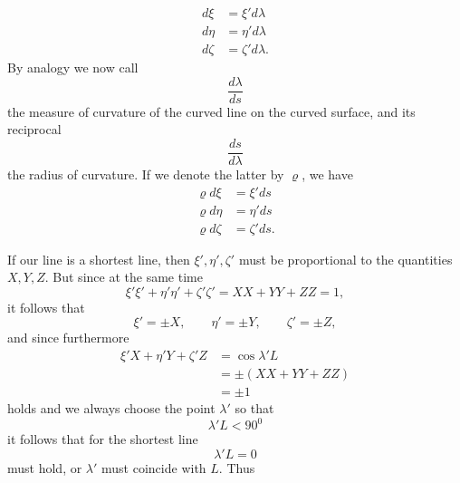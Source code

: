 %
\[
\begin{aligned}
d\xi&=\xi'd\lambda\\
d\eta&=\eta'd\lambda\\
d\zeta&=\zeta'd\lambda.
\end{aligned}
\]
By analogy we now call
\[
\frac{d\lambda}{ds}
\]
the measure of curvature of the curved line on the curved surface, and its reciprocal
\[
\frac{ds}{d\lambda}
\]
the radius of curvature. If we denote the latter by $\varrho$, we have
\[
\begin{aligned}
\varrho d\xi&=\xi'ds\\
\varrho d\eta&=\eta'ds\\
\varrho d\zeta&=\zeta'ds.
\end{aligned}
\]

If our line is a shortest line, then $\xi',\eta',\zeta'$ must be proportional to the quantities $X,Y,Z$. But since at the same time
\[
\xi'\xi'+\eta'\eta'+\zeta'\zeta'=XX+YY+ZZ=1,
\]
it follows that
\[
\xi'=\pm X,\qquad\eta'=\pm Y,\qquad\zeta'=\pm Z,
\]
and since furthermore
\[
\begin{aligned}
\xi'X+\eta'Y+\zeta'Z&=\cos\lambda'L\\
&=\pm(XX+YY+ZZ)\\
&=\pm1
\end{aligned}
\]
holds and we always choose the point $\lambda'$ so that
\[
\lambda'L<90^{0}
\]
it follows that for the shortest line
\[
\lambda'L=0
\]
must hold, or $\lambda'$ must coincide with $L$. Thus
